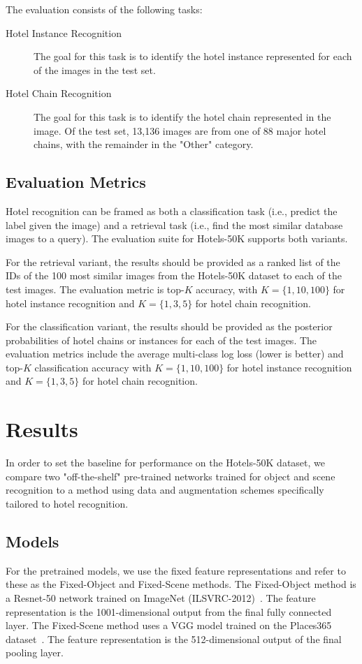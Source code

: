 The evaluation consists of the following tasks:
\begin{description}
\item[Hotel Instance Recognition] The goal for this task is to identify the hotel instance represented for each of the images in the test set.
\item[Hotel Chain Recognition]
The goal for this task is to identify the hotel chain represented in the image. Of 
the test set, 13,136 images are from one of 88 major hotel chains, with the remainder in 
the "Other" category.
\end{description}

\subsection{Evaluation Metrics}
Hotel recognition can be framed as both a classification task (i.e., predict the label given the image) and a retrieval task (i.e., find the most similar database images to a query). The evaluation suite for Hotels-50K supports both variants.

For the retrieval variant, the results should be provided as a
ranked list of the IDs of the 100 most similar images from the Hotels-50K dataset 
to each of the test images. The evaluation metric is top-$K$ accuracy, with $K = \{1, 10, 100\}$ for 
hotel instance recognition and $K = \{1, 3, 5\}$ for hotel chain recognition.

For the classification variant, the results should be provided 
as the posterior probabilities of hotel chains or instances
for each of the test images. The evaluation metrics include the
average multi-class log loss (lower is better) and top-$K$ 
classification accuracy with $K = \{1, 10, 100\}$ for hotel 
instance recognition and $K = \{1, 3, 5\}$ for hotel chain 
recognition.

\section{Results}
In order to set the baseline for performance on the Hotels-50K 
dataset, we compare two "off-the-shelf" pre-trained networks 
trained for object and scene
recognition to a method using data and augmentation schemes specifically tailored to hotel recognition. 

\subsection{Models}
For the pretrained models, we use the fixed feature representations and refer to these as the {\sc Fixed-Object} and {\sc Fixed-Scene} methods. The {\sc Fixed-Object} method is a Resnet-50 network trained on ImageNet (ILSVRC-2012)~\cite{resnet,deng2009imagenet,ILSVRC15}. The feature representation is the 1001-dimensional output from the final fully connected layer. The {\sc Fixed-Scene} method uses a VGG model trained on the Places365 dataset~\cite{zhou2017places}. The feature representation is the 512-dimensional output of the final pooling layer.

